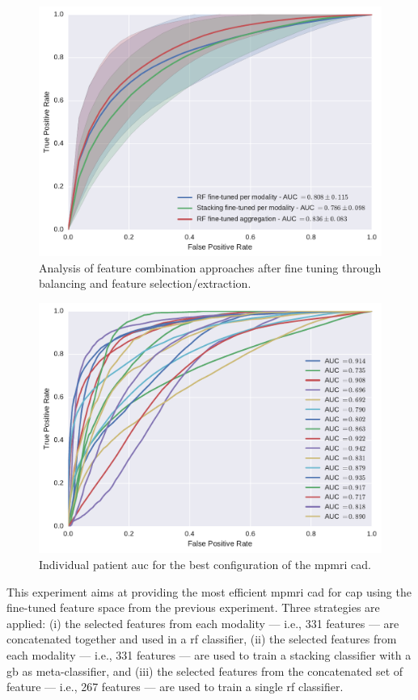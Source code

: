 \begin{figure}
  \centering
  \includegraphics[width=0.7\linewidth]{6_pipeline/figures/exp-5/combine_all.pdf}
  \caption[Analysis of feature combination approaches after fine tuning.]{Analysis of feature combination approaches after fine tuning through balancing and feature selection/extraction.}
  \label{fig:res-Ex4}
\end{figure}

\begin{figure}
  \centering
  \includegraphics[width=0.7\linewidth]{6_pipeline/figures/exp-5/plot_all_patients.pdf}
  \caption{Individual patient \acs*{auc} for the best configuration of the \acs*{mpmri} \acs*{cad}.}
  \label{fig:indauc}
\end{figure}

This experiment aims at providing the most efficient \ac{mpmri} \ac{cad} for \ac{cap} using the fine-tuned feature space from the previous experiment.
Three strategies are applied:
(i) the selected features from each modality --- i.e., 331 features --- are concatenated together and used in a \ac{rf} classifier,
(ii) the selected features from each modality --- i.e., 331 features --- are used to train a stacking classifier with a \ac{gb} as meta-classifier, and
(iii) the selected features from the concatenated set of feature --- i.e., 267 features --- are used to train a single \ac{rf} classifier.

